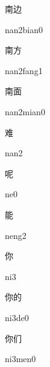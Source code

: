 \begin{verbete}{南边}
\begin{pronuncia}{nan2bian0}
\end{pronuncia}
\end{verbete}

\begin{verbete}{南方}
\begin{pronuncia}{nan2fang1}
\end{pronuncia}
\end{verbete}

\begin{verbete}{南面}
\begin{pronuncia}{nan2mian0}
\end{pronuncia}
\end{verbete}

\begin{verbete}[nan2]{难}
\begin{pronuncia}{nan2}
\end{pronuncia}
\end{verbete}

\begin{verbete}[ne0]{呢}
\begin{pronuncia}{ne0}
\end{pronuncia}
\end{verbete}

\begin{verbete}[neng2]{能}
\begin{pronuncia}{neng2}
\end{pronuncia}
\end{verbete}

\begin{verbete}[ni3]{你}
\begin{pronuncia}{ni3}
\end{pronuncia}
\end{verbete}

\begin{verbete}[ni3de0]{你的}
\begin{pronuncia}{ni3de0}
\end{pronuncia}
\end{verbete}

\begin{verbete}[ni3men0]{你们}
\begin{pronuncia}{ni3men0}
\end{pronuncia}
\end{verbete}

